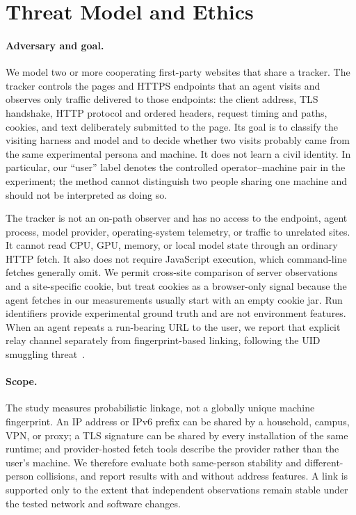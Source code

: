 \section{Threat Model and Ethics}
\label{sec:threat}

\paragraph{Adversary and goal.} We model two or more cooperating first-party websites that share a
tracker.  The tracker controls the pages and HTTPS endpoints that an agent visits and observes only
traffic delivered to those endpoints: the client address, TLS handshake, HTTP protocol and ordered
headers, request timing and paths, cookies, and text deliberately submitted to the page.  Its goal is
to classify the visiting harness and model and to decide whether two visits probably came from the
same experimental persona and machine.  It does not learn a civil identity.  In particular, our
``user'' label denotes the controlled operator--machine pair in the experiment; the method cannot
distinguish two people sharing one machine and should not be interpreted as doing so.

The tracker is not an on-path observer and has no access to the endpoint, agent process, model
provider, operating-system telemetry, or traffic to unrelated sites.  It cannot read CPU, GPU, memory,
or local model state through an ordinary HTTP fetch.  It also does not require JavaScript execution,
which command-line fetches generally omit.  We permit cross-site comparison of server observations
and a site-specific cookie, but treat cookies as a browser-only signal because the agent fetches in
our measurements usually start with an empty cookie jar.  Run identifiers provide experimental
ground truth and are not environment features.  When an agent repeats a run-bearing URL to the user,
we report that explicit relay channel separately from fingerprint-based linking, following the UID
smuggling threat~\cite{randall2022uid}.

\paragraph{Scope.} The study measures probabilistic linkage, not a globally unique machine
fingerprint.  An IP address or IPv6 prefix can be shared by a household, campus, VPN, or proxy; a TLS
signature can be shared by every installation of the same runtime; and provider-hosted fetch tools
describe the provider rather than the user's machine.  We therefore evaluate both same-person
stability and different-person collisions, and report results with and without address features.  A
link is supported only to the extent that independent observations remain stable under the tested
network and software changes.

